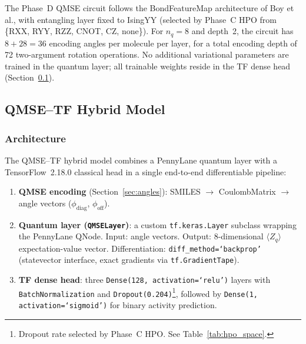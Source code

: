 The Phase~D QMSE circuit follows the BondFeatureMap architecture of
Boy et al.\cite{boy2025}, with entangling layer fixed to IsingYY
(selected by Phase~C HPO from \{RXX, RYY, RZZ, CNOT, CZ, none\}).
For $n_q = 8$ and depth~2, the circuit has $8 + 28 = 36$ encoding angles
per molecule per layer, for a total encoding depth of 72 two-argument
rotation operations. No additional variational parameters are trained
in the quantum layer; all trainable weights reside in the TF dense head
(Section~\ref{sec:tfhead}).


\subsection{QMSE--TF Hybrid Model}
\label{sec:tfhead}

\subsubsection{Architecture}

The QMSE--TF hybrid model combines a PennyLane quantum layer with a
TensorFlow~2.18.0\cite{tensorflow2015} classical head in a single
end-to-end differentiable pipeline:

\begin{enumerate}
  \item \textbf{QMSE encoding} (Section~\ref{sec:angles}): SMILES
        $\to$ CoulombMatrix $\to$ angle vectors ($\phi_\text{diag}$,
        $\phi_\text{off}$).

  \item \textbf{Quantum layer (\texttt{QMSELayer})}: a custom
        \texttt{tf.keras.Layer} subclass wrapping the PennyLane QNode.
        Input: angle vectors. Output: 8-dimensional
        $\langle Z_q \rangle$ expectation-value vector. Differentiation:
        \texttt{diff\_method=`backprop'} (statevector interface, exact
        gradients via \texttt{tf.GradientTape}).

  \item \textbf{TF dense head}: three \texttt{Dense(128, activation=`relu')}
        layers with \texttt{BatchNormalization} and
        \texttt{Dropout(0.204)}\footnote{Dropout rate selected by Phase~C HPO.
        See Table~\ref{tab:hpo_space}.},
        followed by \texttt{Dense(1, activation=`sigmoid')} for binary
        activity prediction.
\end{enumerate}

